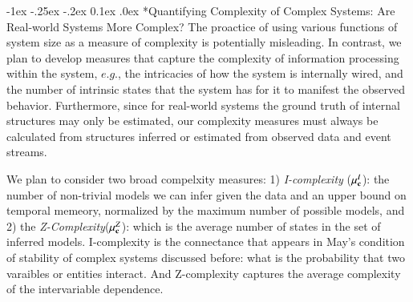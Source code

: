 \documentclass[onecolumn, compsoc,11pt]{IEEEtran}
\makeatletter
\renewcommand\subsection{\@startsection {section}{1}{\z@}%
  {-1ex \@plus -.25ex \@minus -.2ex}%
  {0.1ex \@plus.0ex}%
  {\fontsize{11}{10}\selectfont\bfseries\sffamily\color{DodgerBlue4}}}
\makeatother
\begin{document}
\subsection*{Quantifying Complexity of Complex Systems: Are Real-world Systems More Complex?}
The proactice of using various functions of  system  size as a measure of complexity is potentially misleading. In contrast, we plan to develop measures that capture the complexity of information processing within the system, $e.g.$, the intricacies of how the system is internally wired, and the number of intrinsic states that the system has for it to manifest the observed behavior. Furthermore, since for real-world systems the ground truth of internal structures may only be estimated, our complexity measures must always be calculated from structures inferred or estimated from observed data and event streams.

We plan to consider two broad compelxity measures: 1) \textit{I-complexity} ($\mu_{\mathbf{c}}^I$):  the number of non-trivial models we can infer given the data and an upper bound on temporal memeory, normalized by the maximum number of possible models,   and 2) the \textit{Z-Complexity}($\mu_{\mathbf{c}}^Z$): which is the average number of states in the set of inferred models.
I-complexity  is the connectance that appears in May's condition of stability of complex systems discussed before: what is the probability that two varaibles or entities interact. And Z-complexity captures the average complexity of the intervariable dependence. 
\end{document}
